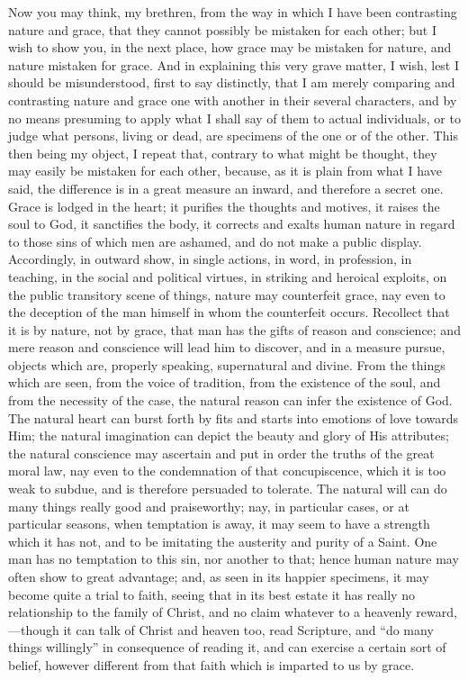 Now you may think, my brethren, from the way in which I have been
contrasting nature and grace, that they cannot possibly be mistaken
for each other; but I wish to show you, in the next place, how grace
may be mistaken for nature, and nature mistaken for grace. And in
explaining this very grave matter, I wish, lest I should be
misunderstood, first to say distinctly, that I am merely comparing and
contrasting nature and grace one with another in their several
characters, and by no means presuming to apply what I shall say of
them to actual individuals, or to judge what persons, living or dead,
are specimens of the one or of the other. This then being my object, I
repeat that, contrary to what might be thought, they may easily be
mistaken for each other, because, as it is plain from what I have
said, the difference is in a great measure an inward, and therefore a
secret one. Grace is lodged in the heart; it purifies the thoughts and
motives, it raises the soul to God, it sanctifies the body, it
corrects and exalts human nature in regard to those sins of which men
are ashamed, and do not make a public display. Accordingly, in outward
show, in single actions, in word, in profession, in teaching, in the
social and political virtues, in striking and heroical exploits, on
the public transitory scene of things, nature may counterfeit grace,
nay even to the deception of the man himself in whom the counterfeit
occurs. Recollect that it is by nature, not by grace, that man has the
gifts of reason and conscience; and mere reason and conscience will
lead him to discover, and in a measure pursue, objects which are,
properly speaking, supernatural and divine. From the things which are
seen, from the voice of tradition, from the existence of the soul, and
from the necessity of the case, the natural reason can infer the
existence of God. The natural heart can burst forth by fits and starts
into emotions of love towards Him; the natural imagination can depict
the beauty and glory of His attributes; the natural conscience may
ascertain and put in order the truths of the great moral law, nay even
to the condemnation of that concupiscence, which it is too weak to
subdue, and is therefore persuaded to tolerate. The natural will can
do many things really good and praiseworthy; nay, in particular cases,
or at particular seasons, when temptation is away, it may seem to have
a strength which it has not, and to be imitating the austerity and
purity of a Saint. One man has no temptation to this sin, nor another
to that; hence human nature may often show to great advantage; and, as
seen in its happier specimens, it may become quite a trial to faith,
seeing that in its best estate it has really no relationship to the
family of Christ, and no claim whatever to a heavenly reward,—though
it can talk of Christ and heaven too, read Scripture, and ``do
many things willingly'' in consequence of reading it, and can
exercise a certain sort of belief, however different from that faith
which is imparted to us by grace.

